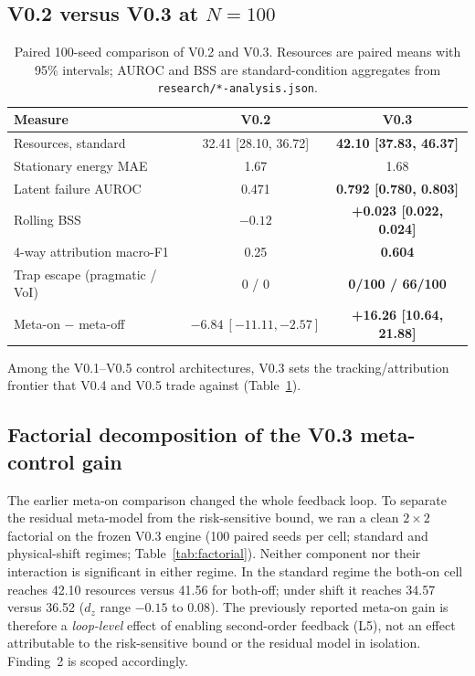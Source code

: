 \documentclass[11pt,a4paper]{article}
\begin{document}
\subsection{V0.2 versus V0.3 at $N=100$}

\begin{table}[t]
\centering
\small
\caption{Paired 100-seed comparison of V0.2 and V0.3. Resources are paired means with 95\% intervals; AUROC and BSS are standard-condition aggregates from \texttt{research/*-analysis.json}.}
\label{tab:v02v03}
\begin{tabular}{lcc}
\toprule
Measure & V0.2 & V0.3 \\
\midrule
Resources, standard & 32.41 [28.10, 36.72] & \textbf{42.10 [37.83, 46.37]} \\
Stationary energy MAE & 1.67 & 1.68 \\
Latent failure AUROC & 0.471 & \textbf{0.792 [0.780, 0.803]} \\
Rolling BSS & $-0.12$ & \textbf{+0.023 [0.022, 0.024]} \\
4-way attribution macro-F1 & 0.25 & \textbf{0.604} \\
Trap escape (pragmatic / VoI) & 0 / 0 & \textbf{0/100 / 66/100} \\
Meta-on $-$ meta-off & $-6.84\ [-11.11,-2.57]$ & \textbf{+16.26 [10.64, 21.88]} \\
\bottomrule
\end{tabular}
\end{table}

Among the V0.1--V0.5 control architectures, V0.3 sets the tracking/attribution frontier that V0.4 and V0.5 trade against (Table~\ref{tab:v02v03}).

\subsection{Factorial decomposition of the V0.3 meta-control gain}

The earlier meta-on comparison changed the whole feedback loop. To separate the residual meta-model from the risk-sensitive bound, we ran a clean $2\times2$ factorial on the frozen V0.3 engine (100 paired seeds per cell; standard and physical-shift regimes; Table~\ref{tab:factorial}). Neither component nor their interaction is significant in either regime. In the standard regime the both-on cell reaches 42.10 resources versus 41.56 for both-off; under shift it reaches 34.57 versus 36.52 ($d_z$ range $-0.15$ to $0.08$). The previously reported meta-on gain is therefore a \emph{loop-level} effect of enabling second-order feedback (L5), not an effect attributable to the risk-sensitive bound or the residual model in isolation. Finding~2 is scoped accordingly.
\end{document}
